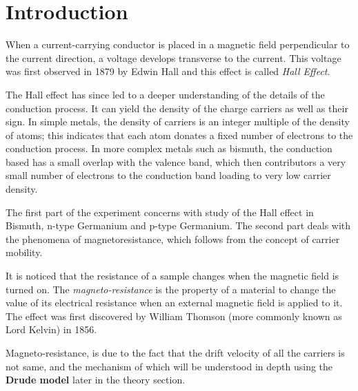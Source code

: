 \documentclass[%
 aip,
 amsmath,amssymb,
 reprint,%
]{revtex4-1}
\begin{document}
\section{Introduction}
    When a current-carrying conductor is placed in a magnetic field perpendicular to the current direction, a voltage develops transverse to the current. This voltage was first observed in 1879 by Edwin Hall and this effect is called \textit{Hall Effect}.
    \par
    The Hall effect has since led to a deeper understanding of the details of the conduction process. It can yield the density of the charge carriers as well as their sign. In simple metals, the density of carriers is an integer multiple of the density of atoms; this indicates that each atom donates a fixed number of electrons to the conduction process. In more complex metals such as bismuth, the conduction based has a small overlap with the valence band, which then contributors a very small number of electrons to the conduction band loading to very low carrier density.
    \par
    The first part of the experiment concerns with study of the Hall effect in Bismuth, n-type Germanium and p-type Germanium. The second part deals with the phenomena of magnetoresistance, which follows from the concept of carrier mobility.
    \par
    It is noticed that the resistance of a sample changes when the magnetic field is turned on. The \textit{magneto-resistance} is the property of a material to change the value of its electrical resistance when an external magnetic field is applied to it. The effect was first discovered by William Thomson (more commonly known as Lord Kelvin) in 1856.
    \par
    Magneto-resistance, is due to the fact that the drift velocity of all the carriers is not same, and the mechanism of which will be understood in depth using the \textbf{Drude model} later in the theory section.
\end{document}
